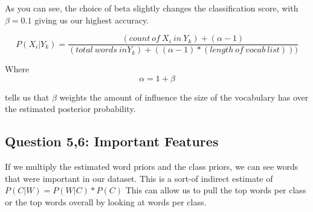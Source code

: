 \documentclass[letterpaper,10pt,english]{/usr/local/lib/python3.4/dist-packages/sphinx/texinputs/sphinxhowto}
\begin{document}
        
    
As you can see, the choice of beta slightly changes the classification
score, with \(\beta = 0.1\) giving us our highest accuracy.

\[P(X_i|Y_k) = \frac{(count\ of\ X_i\ in\ Y_k)+(\alpha -1)}{(total\ words\ in Y_k)+((\alpha - 1)*(length\ of\ vocab\ list)))}\]

Where \[\alpha = 1 + \beta\]

tells us that \(\beta\) weights the amount of influence the size of the
vocabulary has over the estimated posterior probability.\subsection{Question 5,6: Important
Features}\label{question-56-important-features}

If we multiply the estimated word priors and the class priors, we can
see words that were important in our dataset. This is a sort-of indirect
estimate of \(P(C|W) = {P(W|C) * P(C)}\) This can allow us to pull the
top words per class or the top words overall by looking at words per
class.

\end{document}
